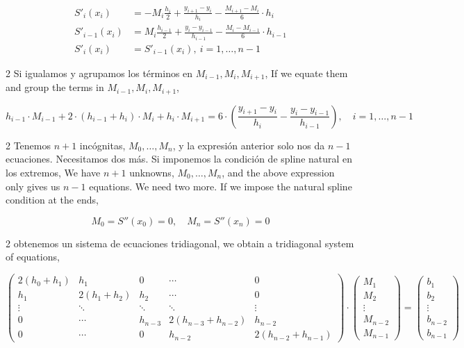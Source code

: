 \begin{align*}
S'_i(x_i)&=-M_i\frac{h_i}{2}+\frac{y_{i+1}-y_i}{h_i}-\frac{M_{i+1}-M_i}{6}\cdot h_i\\
S'_{i-1}(x_i)&=M_{i}\frac{h_{i-1}}{2}+\frac{y_i-y_{i-1}}{h_{i-1}}-\frac{M_i-M_{i-1}}{6}\cdot h_{i-1}\\
S'_i(x_i)&=S'_{i-1}(x_i) ,\   i=1,\dots, n-1
\end{align*}
\begin{paracol}{2}
Si igualamos y agrupamos los términos en $M_{i-1}, M_i, M_{i+1}$,
\switchcolumn
If we equate them and group the terms in $M_{i-1}, M_i, M_{i+1}$,
\end{paracol}
\begin{equation*}
h_{i-1}\cdot M_{i-1}+2\cdot (h_{i-1}+h_i)\cdot M_i+h_i\cdot M_{i+1}=6\cdot \left(\frac{y_{i+1}-y_i}{h_i}-\frac{y_i-y_{i-1}}{h_{i-1}}\right),\quad i=1,\dots ,n-1
\end{equation*}
\begin{paracol}{2}
Tenemos $n+1$ incógnitas, $M_0,\dots, M_n$, y la expresión anterior solo nos da $n-1$ ecuaciones. Necesitamos dos más. Si imponemos la condición de spline natural en los extremos,
\switchcolumn
We have $n+1$ unknowns, $M_0,\dots, M_n$, and the above expression only gives us $n-1$ equations. We need two more. If we impose the natural spline condition at the ends,
\end{paracol}
\begin{equation*}
M_0=S''(x_0)=0, \quad M_n=S''(x_n)=0
\end{equation*}
\begin{paracol}{2}
obtenemos un sistema de ecuaciones tridiagonal,
\switchcolumn
we obtain a tridiagonal system of equations,
\end{paracol}
\begin{equation*}
\begin{pmatrix}
2(h_0+h_1) & h_1 & 0 &\cdots &0\\
 h_1 & 2(h_1+h_2) & h_2 & \cdots & 0\\
\vdots & \ddots & \ddots & \ddots &\vdots \\
0 & \cdots& h_{n-3}& 2(h_{n-3}+h_{n-2}) & h_{n-2} \\
0 & \cdots &0&h_{n-2} & 2(h_{n-2}+h_{n-1})
\end{pmatrix}\cdot \begin{pmatrix}
M_1\\
M_2\\
\vdots \\
M_{n-2}\\
M_{n-1}
\end{pmatrix}=\begin{pmatrix}
b_1\\
b_2\\
\vdots \\
b_{n-2}\\
b_{n-1}
\end{pmatrix}
\end{equation*}
